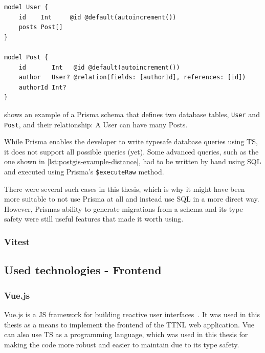 \begin{lstlisting}[float, caption={Example of a Prisma schema}, label={lst:prisma-schema-example}]
model User {
    id    Int     @id @default(autoincrement())
    posts Post[]
}
    
model Post {
    id       Int   @id @default(autoincrement())
    author   User? @relation(fields: [authorId], references: [id])
    authorId Int?
}
\end{lstlisting}

 shows an example of a Prisma schema that defines two database tables, \lstinline{User} and \lstinline{Post}, and their relationship: A User can have many Posts.

While Prisma enables the developer to write typesafe database queries using \ac{TS}, it does not support all possible queries (yet).
Some advanced queries, such as the one shown in \cref{lst:postgis-example-distance}, had to be written by hand using \ac{SQL} and executed using Prisma's \lstinline|$executeRaw| method.

There were several such cases in this thesis, which is why it might have been more suitable to not use Prisma at all and instead use \ac{SQL} in a more direct way.
However, Prismas ability to generate migrations from a schema and its type safety were still useful features that made it worth using.

\subsubsection{Vitest}


\subsection{Used technologies - Frontend}

\subsubsection{Vue.js}

Vue.js is a \ac{JS} framework for building reactive user interfaces~\cite{evan_you_vuejs_2023}.
It was used in this thesis as a means to implement the frontend of the \ac{TTNL} web application.
Vue can also use \ac{TS} as a programming language, which was used in this thesis for making the code more robust and easier to maintain due to its type safety.

